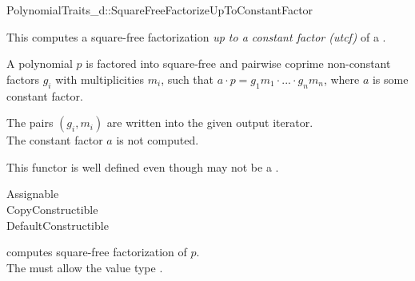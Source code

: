\begin{ccRefConcept}{PolynomialTraits_d::SquareFreeFactorizeUpToConstantFactor}

\ccDefinition

This  computes a square-free factorization 
{\em up to a constant factor (utcf)} of a 
. 

A polynomial $p$ is factored into square-free and pairwise coprime non-constant
factors $g_i$ with multiplicities $m_i$, such that 
$a  \cdot  p = g_1m_1  \cdot  ...  \cdot  g_nm_n$, where $a$ is some constant factor. 

The pairs $(g_i,m_i)$ are written into the given output iterator.\\
The constant factor $a$ is not computed.
          
This functor is well defined even though 
 may not be a 
.

\ccRefines 

Assignable\\
CopyConstructible\\
DefaultConstructible\\



\ccOperations


{ computes square-free factorization of $p$.\\
  The  must allow the value type  
   .
}



\ccSeeAlso

\\
\\
\\

\end{ccRefConcept}
